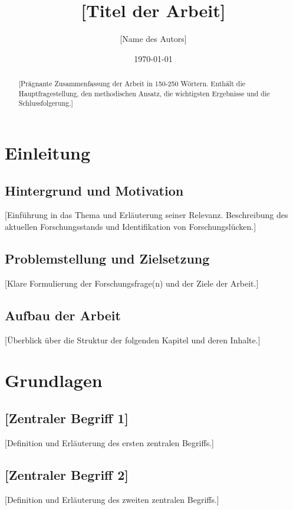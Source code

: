 \documentclass[a4paper,12pt]{article}
\title{[Titel der Arbeit]}
\author{[Name des Autors]}
\date{\today}
\begin{document}
\maketitle
\newpage

\begin{abstract}
[Prägnante Zusammenfassung der Arbeit in 150-250 Wörtern. Enthält die Hauptfragestellung, den methodischen Ansatz, die wichtigsten Ergebnisse und die Schlussfolgerung.]
\end{abstract}
\newpage

\tableofcontents
\newpage

\listoffigures
\listoftables
\newpage

\section{Einleitung}
\subsection{Hintergrund und Motivation}
[Einführung in das Thema und Erläuterung seiner Relevanz. Beschreibung des aktuellen Forschungsstands und Identifikation von Forschungslücken.]

\subsection{Problemstellung und Zielsetzung}
[Klare Formulierung der Forschungsfrage(n) und der Ziele der Arbeit.]

\subsection{Aufbau der Arbeit}
[Überblick über die Struktur der folgenden Kapitel und deren Inhalte.]

\section{Grundlagen}
\subsection{[Zentraler Begriff 1]}
[Definition und Erläuterung des ersten zentralen Begriffs.]

\subsection{[Zentraler Begriff 2]}
[Definition und Erläuterung des zweiten zentralen Begriffs.]
\end{document}

